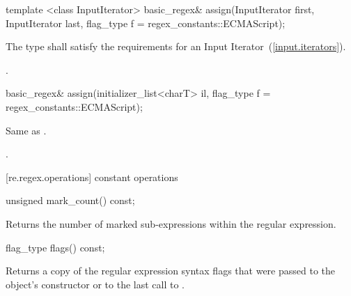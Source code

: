%
%
\begin{itemdecl}
template <class InputIterator>
  basic_regex& assign(InputIterator first, InputIterator last,
                      flag_type f = regex_constants::ECMAScript);
\end{itemdecl}

\begin{itemdescr}
\pnum
\requires  The type  shall satisfy the requirements for an Input
Iterator~(\ref{input.iterators}).

\pnum
\returns  {}.
\end{itemdescr}

%
%
\begin{itemdecl}
basic_regex& assign(initializer_list<charT> il,
                    flag_type f = regex_constants::ECMAScript);
\end{itemdecl}

\begin{itemdescr}
\pnum
\effects Same as .

\pnum
\returns {}.
\end{itemdescr}


[re.regex.operations]{ constant operations}

%
%
\begin{itemdecl}
unsigned mark_count() const; 
\end{itemdecl}

\begin{itemdescr}
\pnum
\effects  Returns the number of marked sub-expressions within the
regular expression.
\end{itemdescr}

%
%
\begin{itemdecl}
flag_type flags() const; 
\end{itemdecl}

\begin{itemdescr}
\pnum
\effects  Returns a copy of the regular expression syntax flags that
were passed to the object's constructor or to the last call
to .
\end{itemdescr}

